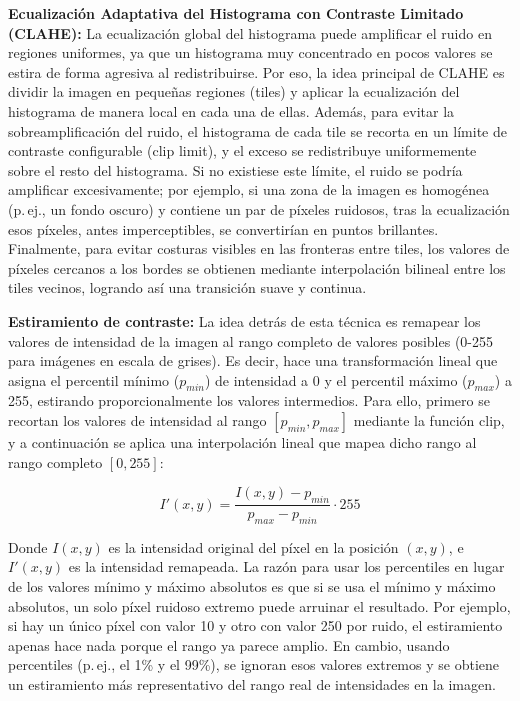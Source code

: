\textbf{Ecualización Adaptativa del Histograma con Contraste Limitado (CLAHE):} La ecualización global del histograma puede amplificar el ruido en regiones uniformes, ya que un histograma muy concentrado en pocos valores se estira de forma agresiva al redistribuirse. Por eso, la idea principal de CLAHE \cite{zuiderveld1994clahe} es dividir la imagen en pequeñas regiones (tiles) y aplicar la ecualización del histograma de manera local en cada una de ellas. Además, para evitar la sobreamplificación del ruido, el histograma de cada tile se recorta en un límite de contraste configurable (clip limit), y el exceso se redistribuye uniformemente sobre el resto del histograma. Si no existiese este límite, el ruido se podría amplificar excesivamente; por ejemplo, si una zona de la imagen es homogénea (p.\,ej., un fondo oscuro) y contiene un par de píxeles ruidosos, tras la ecualización esos píxeles, antes imperceptibles, se convertirían en puntos brillantes. Finalmente, para evitar costuras visibles en las fronteras entre tiles, los valores de píxeles cercanos a los bordes se obtienen mediante interpolación bilineal entre los tiles vecinos, logrando así una transición suave y continua.

\textbf{Estiramiento de contraste:} La idea detrás de esta técnica es remapear los valores de intensidad de la imagen al rango completo de valores posibles (0-255 para imágenes en escala de grises). Es decir, hace una transformación lineal que asigna el percentil mínimo ($p_{min}$) de intensidad a 0 y el percentil máximo ($p_{max}$) a 255, estirando proporcionalmente los valores intermedios. Para ello, primero se recortan los valores de intensidad al rango $[p_{min}, p_{max}]$ mediante la función $\text{clip}$, y a continuación se aplica una interpolación lineal que mapea dicho rango al rango completo $[0, 255]$:

\begin{equation}
I'(x,y) = \frac{I(x,y) - p_{min}}{p_{max} - p_{min}} \cdot 255
\end{equation}

Donde $I(x,y)$ es la intensidad original del píxel en la posición $(x,y)$, e $I'(x,y)$ es la intensidad remapeada. La razón para usar los percentiles en lugar de los valores mínimo y máximo absolutos es que si se usa el mínimo y máximo absolutos, un solo píxel ruidoso extremo puede arruinar el resultado. Por ejemplo, si hay un único píxel con valor 10 y otro con valor 250 por ruido, el estiramiento apenas hace nada porque el rango ya parece amplio. En cambio, usando percentiles (p.\,ej., el 1\% y el 99\%), se ignoran esos valores extremos y se obtiene un estiramiento más representativo del rango real de intensidades en la imagen.

